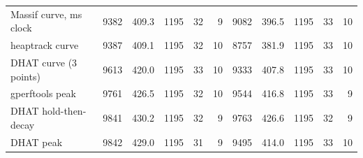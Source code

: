 \begin{tabular}{lrrrrrrrrrr}
Massif curve, ms clock & 9382 & 409.3 & 1195 & 32 & 9 & 9082 & 396.5 & 1195 & 33 & 10 \\
heaptrack curve & 9387 & 409.1 & 1195 & 32 & 10 & 8757 & 381.9 & 1195 & 33 & 10 \\
DHAT curve (3 points) & 9613 & 420.0 & 1195 & 33 & 10 & 9333 & 407.8 & 1195 & 33 & 10 \\
gperftools peak & 9761 & 426.5 & 1195 & 32 & 10 & 9544 & 416.8 & 1195 & 33 & 9 \\
DHAT hold-then-decay & 9841 & 430.2 & 1195 & 32 & 9 & 9763 & 426.6 & 1195 & 32 & 9 \\
DHAT peak & 9842 & 429.0 & 1195 & 31 & 9 & 9495 & 414.0 & 1195 & 33 & 10 \\
\bottomrule
\end{tabular}
